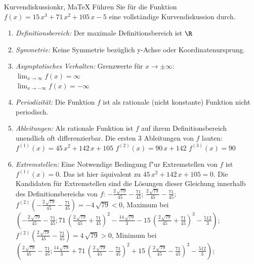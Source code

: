  \providecommand{\MoIl}{(} 
 \providecommand{\MoIr}{)}
 \providecommand{\MIntvlSep}{;} 
 \providecommand{\MElSetSep}{;} 
 \begin{MAufgabe}{Kurvendiskussion}{kr, MaTeX}
 F\"uhren Sie f\"ur die Funktion $f(x)=15\, x^3 + 71\, x^2 + 105\, x - 5$ eine vollst\"andige Kurvendiskussion durch.\\ 
 \ifLsg\Loesung
 \begin{enumerate}
 \item \emph{Definitionsbereich:} 
 Der maximale Definitionsbereich ist $\R$\item \emph{Symmetrie:} 
 Keine Symmetrie bez\"uglich y-Achse oder Koordinatenursprung.\item \emph{Asymptotisches Verhalten:} 
 Grenzwerte f\"ur $x\rightarrow \pm \infty$: \\ 
 $\lim_{x\rightarrow \infty} f(x)=\infty$ \\ 
 $\lim_{x\rightarrow -\infty} f(x)=- \infty$ \\ 
 \item \emph{Periodizit\"at:} 
 Die Funktion $f$ ist als rationale (nicht konstante) Funktion nicht periodisch.\item \emph{Ableitungen:} 
 Als rationale Funktion ist $f$ auf ihrem Definitionsbereich unendlich oft differenzierbar. 
 Die ersten 3 Ableitungen von $f$ lauten: \\ 
 $f^{(1)}(x)=45\, x^2 + 142\, x + 105$\newline 
  $f^{(2)}(x)=90\, x + 142$\newline 
  $f^{(3)}(x)=90$\newline 
  \item \emph{Extremstellen:} 
 Eine Notwendige Bedingung f"ur Extremstellen von $f$ ist $f^{(1)}(x)=0$. 
 Das ist hier \"aquivalent zu $45\, x^2 + 142\, x + 105=0$. 
 Die Kandidaten f\"ur Extremstellen sind die L\"osungen dieser Gleichung innerhalb des Definitionsbereichs von $f$: $ - \frac{2\, \sqrt{79}}{45} - \frac{71}{45}$; $\frac{2\, \sqrt{79}}{45} - \frac{71}{45}$; \\ 
 $f^{(2)}( - \frac{2\, \sqrt{79}}{45} - \frac{71}{45})=- 4\, \sqrt{79}$$<0$, Maximum bei $( - \frac{2\, \sqrt{79}}{45} - \frac{71}{45};71\, {\left(\frac{2\, \sqrt{79}}{45} + \frac{71}{45}\right)}^2 - \frac{14\, \sqrt{79}}{3} - 15\, {\left(\frac{2\, \sqrt{79}}{45} + \frac{71}{45}\right)}^3 - \frac{512}{3})$; \\ 
 $f^{(2)}(\frac{2\, \sqrt{79}}{45} - \frac{71}{45})=4\, \sqrt{79}$$>0$, Minimum bei $(\frac{2\, \sqrt{79}}{45} - \frac{71}{45};\frac{14\, \sqrt{79}}{3} + 71\, {\left(\frac{2\, \sqrt{79}}{45} - \frac{71}{45}\right)}^2 + 15\, {\left(\frac{2\, \sqrt{79}}{45} - \frac{71}{45}\right)}^3 - \frac{512}{3})$; \\ 

\end{enumerate}
\end{MAufgabe}

